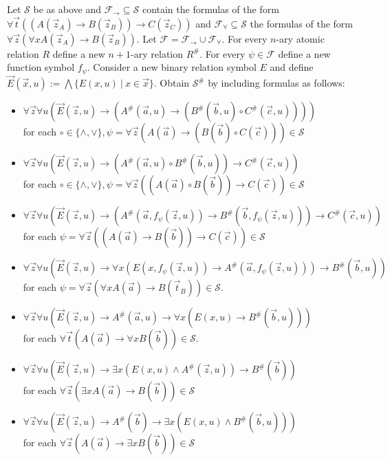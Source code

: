\documentclass[a4paper,UKenglish,cleveref, autoref, thm-restate]{lipics-v2021}
\begin{document}
\begin{theorem}\label{fullFOtranslation}
	Let $\mathcal S$ be as above and $\mathcal F_\to\subseteq\mathcal S$ contain the formulas of the form $\forall \vec t((A(\vec z_A)\to B(\vec z_B))\to C(\vec z_C))$ and $\mathcal F_\forall\subseteq\mathcal S$ the formulas of the form $\forall \vec z(\forall xA(\vec z_A)\to B(\vec z_B))$. Let $\mathcal F = \mathcal F_\to\cup\mathcal F_\forall$. For every $n$-ary atomic relation $R$ define a new $n+1$-ary relation $R^\#$. For every $\psi\in\mathcal F$ define a new function symbol $f_\psi$. Consider a new binary relation symbol $E$ and define $\vec E(\vec x, u) := \bigwedge\{E(x, u)\:|\:x\in\vec x\}$. Obtain $\mathcal S^\#$ by including formulas as follows:
	\begin{itemize}
		\item $\forall \vec z\forall u(\vec E(\vec z, u)\to (A^\#(\vec a, u)\to (B^\#(\vec b, u)\circ C^\#(\vec c, u))))$\\for each $\circ\in\{\wedge, \vee\}, \psi = \forall \vec z(A(\vec a)\to (B(\vec b)\circ C(\vec c)))\in\mathcal S$
		\item $\forall \vec z\forall u(\vec E(\vec z, u)\to (A^\#(\vec a, u)\circ B^\#(\vec b, u))\to C^\#(\vec c, u))$\\for each $\circ\in\{\wedge, \vee\}, \psi = \forall \vec z((A(\vec a)\circ B(\vec b))\to C(\vec c))\in\mathcal S$
		\item $\forall \vec z\forall u(\vec E(\vec z, u)\to(A^\#(\vec a, f_\psi(\vec z, u))\to B^\#(\vec b, f_\psi(\vec z, u)))\to C^\#(\vec c, u))$\\for each $\psi = \forall \vec z((A(\vec a)\to B(\vec b))\to C(\vec c))\in\mathcal S$
		\item  $\forall \vec z\forall u(\vec E(\vec z, u)\to \forall x(E(x, f_\psi(\vec z, u))\to A^\#(\vec a, f_\psi(\vec z, u)))\to B^\#(\vec b, u))$\\for each $\psi = \forall \vec z(\forall xA(\vec a)\to B(\vec t_B))\in\mathcal S$.
		\item $\forall \vec z\forall u(\vec E(\vec z, u)\to A^\#(\vec a, u)\to \forall x(E(x, u)\to B^\#(\vec b, u)))$\\for each $\forall \vec t(A(\vec a)\to \forall xB(\vec b))\in\mathcal S$.
		\item $\forall \vec z\forall u(\vec E(\vec z, u)\to \exists x(E(x, u)\wedge A^\#(\vec z, u))\to B^\#(\vec b))$\\for each $\forall \vec z(\exists xA(\vec a)\to B(\vec b))\in\mathcal S$
		\item $\forall \vec z\forall u(\vec E(\vec z, u)\to A^\#(\vec b)\to \exists x(E(x, u)\wedge B^\#(\vec b, u)))$\\for each $\forall \vec z(A(\vec a)\to \exists xB(\vec b))\in\mathcal S$

\end{itemize}
\end{theorem}
\end{document}
